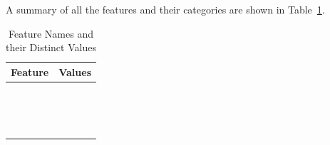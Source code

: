 \documentclass[
  letterpaper,
  DIV=11,
  numbers=noendperiod]{scrartcl}
\begin{document}
A summary of all the features and their categories are shown in
Table~\ref{tbl-summary-pdf}.

\begin{longtable}{>{\raggedright\arraybackslash}p{}>{\raggedright\arraybackslash}p{}}

\caption{\label{tbl-summary-pdf}Feature Names and their Distinct Values}

\tabularnewline

\toprule
Feature & Values \\ 
\midrule\addlinespace[2.5pt]
\cellcolor[HTML]{FFFFFF}{Gender} & \cellcolor[HTML]{FFFFFF}{Female, Male} \\ 
\cellcolor[HTML]{FFFFFF}{Smoking} & \cellcolor[HTML]{FFFFFF}{Yes, No} \\ 
\cellcolor[HTML]{FFFFFF}{Hx Smoking} & \cellcolor[HTML]{FFFFFF}{Yes, No} \\ 
\cellcolor[HTML]{FFFFFF}{Hx Radiotherapy} & \cellcolor[HTML]{FFFFFF}{Yes, No} \\ 
\cellcolor[HTML]{FFFFFF}{Thyroid Function} & \cellcolor[HTML]{FFFFFF}{Euthyroid, Clinical Hyperthyroidism, Subclinical Hyperthyroidism, Clinical Hypothyroidism, Subclinical Hypothyroidism} \\ 
\cellcolor[HTML]{FFFFFF}{Physical Examination} & \cellcolor[HTML]{FFFFFF}{Normal, Diffuse goiter, Single nodular goiter-right, Single nodular goiter-left, Multinodular goiter} \\ 
\cellcolor[HTML]{FFFFFF}{Adenopathy} & \cellcolor[HTML]{FFFFFF}{No, Right, Left, Bilateral, Posterior, Extensive} \\ 
\cellcolor[HTML]{FFFFFF}{Pathology} & \cellcolor[HTML]{FFFFFF}{Papillary, Micropapillary, Follicular, Hurthel cell} \\ 
\cellcolor[HTML]{FFFFFF}{Focality} & \cellcolor[HTML]{FFFFFF}{Uni-Focal, Multi-Focal} \\ 
\cellcolor[HTML]{FFFFFF}{Risk} & \cellcolor[HTML]{FFFFFF}{Low, Intermediate, High} \\ 
\cellcolor[HTML]{FFFFFF}{T} & \cellcolor[HTML]{FFFFFF}{T1a, T1b, T2, T3a, T3b, T4a, T4b} \\ 
\cellcolor[HTML]{FFFFFF}{N} & \cellcolor[HTML]{FFFFFF}{N0, N1b, N1a} \\ 
\cellcolor[HTML]{FFFFFF}{M} & \cellcolor[HTML]{FFFFFF}{M0, M1} \\ 
\cellcolor[HTML]{FFFFFF}{Stage} & \cellcolor[HTML]{FFFFFF}{I, II, III, IVA, IVB} \\ 
\cellcolor[HTML]{FFFFFF}{Response} & \cellcolor[HTML]{FFFFFF}{Excellent, Biochemical Incomplete, Structural Incomplete, Indeterminate} \\ 
\bottomrule

\end{longtable}
\end{document}
